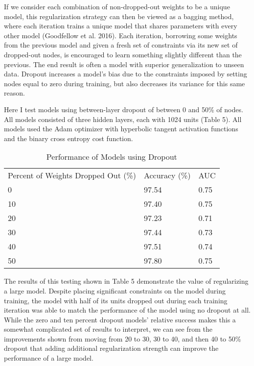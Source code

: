 \documentclass[12pt]{article}  %
\theoremstyle{definition}
\theoremstyle{remark}
\begin{document}
\par If we consider each combination of non-dropped-out weights to be a unique model, this regularization strategy can then be viewed as a bagging method, where each iteration trains a unique model that shares parameters with every other model (Goodfellow et al. 2016). Each iteration, borrowing some weights from the previous model and given a fresh set of constraints via its new set of dropped-out nodes, is encouraged to learn something slightly different than the previous. The end result is often a model with superior generalization to unseen data. Dropout increases a model's bias due to the constraints imposed by setting nodes equal to zero during training, but also decreases its variance for this same reason. 

\par Here I test models using between-layer dropout of between 0 and 50\% of nodes. All models consisted of three hidden layers, each with 1024 units (Table 5). All models used the Adam optimizer with hyperbolic tangent activation functions and the binary cross entropy cost function.

\begin{table}[!h]
\centering
\caption{Performance of Models using Dropout}
\label{my-label}
\begin{tabular}{lll}
Percent of Weights Dropped Out (\%) & Accuracy (\%) & AUC  \\
0                          & 97.54         & 0.75 \\
10                         & 97.40         & 0.75 \\
20                         & 97.23         & 0.71 \\
30                         & 97.44         & 0.73 \\
40                         & 97.51         & 0.74 \\
50                         & 97.80         & 0.75
\end{tabular}
\end{table}


\par The results of this testing shown in Table 5 demonstrate the value of regularizing a large model. Despite placing significant constraints on the model during training, the model with half of its units dropped out during each training iteration was able to match the performance of the model using no dropout at all. While the zero and ten percent dropout models' relative success makes this a somewhat complicated set of results to interpret, we can see from the improvements shown from moving from 20 to 30, 30 to 40, and then 40 to 50\% dropout that adding additional regularization strength can improve the performance of a large model. 
\end{document}

